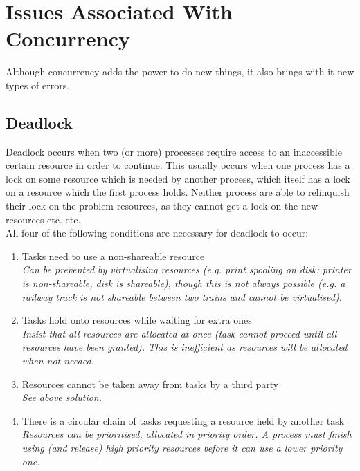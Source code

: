 \documentclass[a4paper,oneside]{report}
\begin{document}
    	
  	\section{Issues Associated With Concurrency}
  	
  	Although concurrency adds the power to do new things, it also brings with it new types of errors.
  	
    	\subsection{Deadlock}
    	Deadlock occurs when two (or more) processes require access to an inaccessible certain resource in order to continue. This usually occurs when one process has a lock on some resource which is needed by another process, which itself has a lock on a resource which the first process holds. Neither process are   able to relinquish their lock on the problem resources, as they cannot get a lock on the new resources etc. etc.\\
    	
    	\noindent All four of the following conditions are necessary for deadlock to occur: 
    	\begin{enumerate}
    		\item Tasks need to use a non-shareable resource\\ 
    			  \emph{Can be prevented by virtualising resources (e.g. print spooling on disk: printer is non-shareable, disk is shareable), though this is not always possible (e.g. a railway track is not shareable between two trains and cannot be virtualised).}
    		\item Tasks hold onto resources while waiting for extra ones\\
    			  \emph{Insist that all resources are allocated at once (task cannot proceed until all resources have been granted). This is inefficient as resources will be allocated when not needed.}
    		\item Resources cannot be taken away from tasks by a third party\\
    			  \emph{See above solution.}
    		\item There is a circular chain of tasks requesting a resource held by another task\\
    			  \emph{Resources can be prioritised, allocated in priority order. A process must finish using (and release) high priority resources before it can use a lower priority one.}
    	\end{enumerate}
    	
\end{document}
